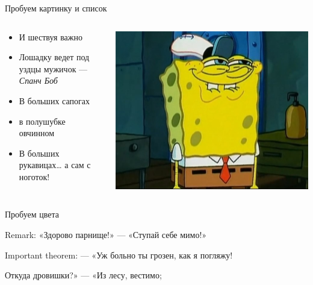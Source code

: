 \documentclass{beamer}
\begin{document}
\begin{frame}{Пробуем картинку и список} 
        \begin{columns}[T,onlytextwidth]
                \begin{column}{0.44\textwidth}
                        \begin{itemize}
                                \item \alert{И шествуя важно}
                                \item Лошадку ведет под уздцы мужичок --- \emph{Спанч Боб}
                                \item В больших сапогах
                                \item в полушубке овчинном
                                \item В больших рукавицах… а \alert{сам с ноготок!}
                        \end{itemize}
                \end{column}
                \begin{column}{0.56\textwidth}
                        \includegraphics[width=\textwidth]{spanch_bob.jpeg}
                \end{column}
        \end{columns}
\end{frame}

\begin{frame}{Пробуем цвета}
        \begin{block}{Remark:}
        «Здорово парнище!» — «Ступай себе мимо!»
        \end{block}

        \begin{alertblock}{Important theorem:}
        — «Уж больно ты грозен, как я погляжу!
        \end{alertblock}

        \begin{examples}
       Откуда дровишки?» — «Из лесу, вестимо;
        \end{examples}
\end{frame}
\end{document}
